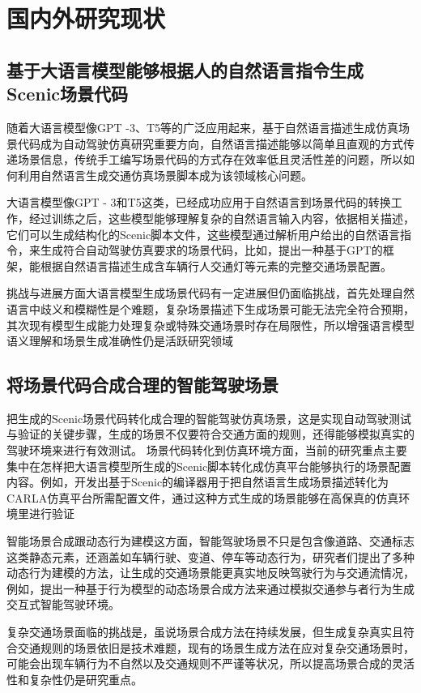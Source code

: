 \section{国内外研究现状}
\subsection{基于大语言模型能够根据人的自然语言指令生成Scenic场景代码}
随着大语言模型像GPT -3、T5等的广泛应用起来，基于自然语言描述生成仿真场景代码成为自动驾驶仿真研究重要方向，自然语言描述能够以简单且直观的方式传递场景信息\cite{klischat2020scenario}，传统手工编写场景代码的方式存在效率低且灵活性差的问题，所以如何利用自然语言生成交通仿真场景脚本成为该领域核心问题。

大语言模型像GPT - 3和T5这类\cite{Xu2023DriveGPT4}，已经成功应用于自然语言到场景代码的转换工作，经过训练之后，这些模型能够理解复杂的自然语言输入内容，依据相关描述，它们可以生成结构化的Scenic脚本文件\cite{scenario_runner_contributors2019carla}，这些模型通过解析用户给出的自然语言指令，来生成符合自动驾驶仿真要求的场景代码，比如，提出一种基于GPT的框架，能根据自然语言描述生成含车辆行人交通灯等元素的完整交通场景配置。

挑战与进展方面大语言模型生成场景代码有一定进展但仍面临挑战，首先处理自然语言中歧义和模糊性是个难题，复杂场景描述下生成场景可能无法完全符合预期，其次现有模型生成能力处理复杂或特殊交通场景时存在局限性，所以增强语言模型语义理解和场景生成准确性仍是活跃研究领域

\subsection{将场景代码合成合理的智能驾驶场景}
把生成的Scenic场景代码转化成合理的智能驾驶仿真场景，这是实现自动驾驶测试与验证的关键步骤，生成的场景不仅要符合交通方面的规则，还得能够模拟真实的驾驶环境来进行有效测试。
场景代码转化到仿真环境方面，当前的研究重点主要集中在怎样把大语言模型所生成的Scenic脚本转化成仿真平台能够执行的场景配置内容。例如，开发出基于Scenic的编译器用于把自然语言生成场景描述转化为CARLA仿真平台所需配置文件，通过这种方式生成的场景能够在高保真的仿真环境里进行验证

智能场景合成跟动态行为建模这方面，智能驾驶场景不只是包含像道路、交通标志这类静态元素，还涵盖如车辆行驶、变道、停车等动态行为，研究者们提出了多种动态行为建模的方法，让生成的交通场景能更真实地反映驾驶行为与交通流情况，例如，提出一种基于行为模型的动态场景合成方法来通过模拟交通参与者行为生成交互式智能驾驶环境。

复杂交通场景面临的挑战是，虽说场景合成方法在持续发展，但生成复杂真实且符合交通规则的场景依旧是技术难题，现有的场景生成方法在应对复杂交通场景时，可能会出现车辆行为不自然以及交通规则不严谨等状况，所以提高场景合成的灵活性和复杂性仍是研究重点。

